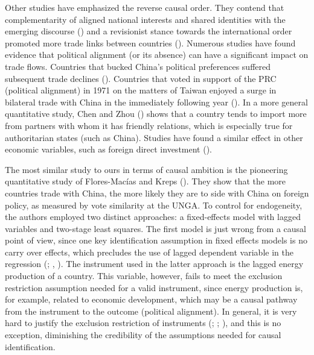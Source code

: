 \documentclass[
  12pt,
]{article}
\begin{document}
Other studies have emphasized the reverse causal order. They contend
that complementarity of aligned national interests and shared identities
with the emerging discourse ()
and a revisionist stance towards the international order promoted more
trade links between countries
().
Numerous studies have found evidence that political alignment (or its
absence) can have a significant impact on trade flows. Countries that
bucked China's political preferences suffered subsequent trade declines
(). Countries that
voted in support of the PRC (political alignment) in 1971 on the matters
of Taiwan enjoyed a surge in bilateral trade with China in the
immediately following year (). In a more general quantitative study, Chen and Zhou
() shows that a country tends to
import more from partners with whom it has friendly relations, which is
especially true for authoritarian states (such as China). Studies have
found a similar effect in other economic variables, such as foreign
direct investment ().

The most similar study to ours in terms of causal ambition is the
pioneering quantitative study of Flores-Macías and Kreps
(). They show that the more
countries trade with China, the more likely they are to side with China
on foreign policy, as measured by vote similarity at the UNGA. To
control for endogeneity, the authors employed two distinct approaches: a
fixed-effects model with lagged variables and two-stage least squares.
The first model is just wrong from a causal point of view, since one key
identification assumption in fixed effects models is no carry over
effects, which precludes the use of lagged dependent variable in the
regression (; ,
). The instrument used in the latter
approach is the lagged energy production of a country. This variable,
however, fails to meet the exclusion restriction assumption needed for a
valid instrument, since energy production is, for example, related to
economic development, which may be a causal pathway from the instrument
to the outcome (political alignment). In general, it is very hard to
justify the exclusion restriction of instruments
(;
;
), and this is no exception,
diminishing the credibility of the assumptions needed for causal
identification.
\end{document}
